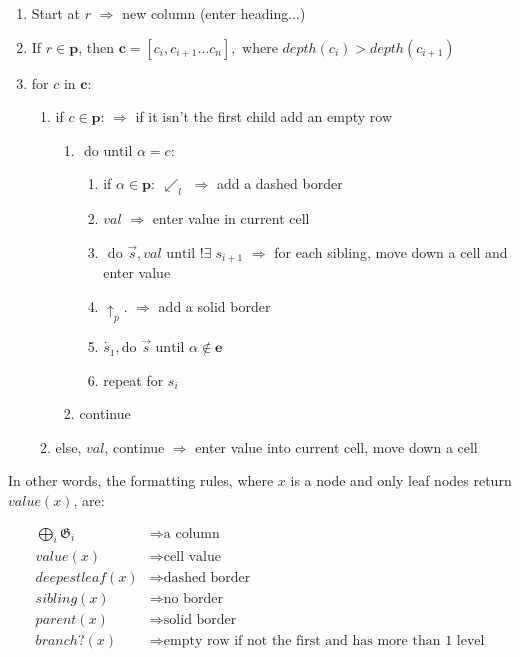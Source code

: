 \documentclass[11pt]{article}
\newcommand{\gr}[1]{\mathfrak{#1}}
\newcommand{\greycol}{black!20}
\newcommand{\grey}[1]{\textcolor{\greycol}{#1}}
\newcommand{\green}[1]{\textcolor{black!50!green}{#1}}
\begin{document}
\begin{enumerate}
	\item Start at $r$ \green{$\Rightarrow $ new column (enter heading...)}
	\item \grey{If $r \in \mathbf{p}$, then $\mathbf{c} = [c_i, c_{i+1} \dotsc c_n], \text{ where } depth(c_i) > depth(c_{i+1})$}
	\item \grey{for $c$ in $\mathbf{c}:$}
	\begin{enumerate}
			\item if $c \in \mathbf{p}$: \green{$\Rightarrow$ if it isn't the first child add an empty row}
			\begin{enumerate}
				\item \grey{$\text{ do until } \alpha = c:$}
				\begin{enumerate}
					\item if $\alpha \in \mathbf{p}: \:\swarrow_l$  \green{$\Rightarrow$ add a dashed border}
					\item $val$  \green{$\Rightarrow$ enter value in current cell}
					\item  $\text{ do } \overrightarrow{s},val \text{ until } !\exists\; s_{i+1}$ \green{$\Rightarrow$ for each sibling, move down a cell and enter value}
					\item $\uparrow_p$. \green{$\Rightarrow$ add a solid border}
					\item \grey{$\overleftarrow{s_1}, \text{do } \overrightarrow{s} \text{ until } \alpha \not\in \mathbf{e}$}
					\item \grey{repeat for $s_i$}
				\end{enumerate}
				\item \grey{continue}
			\end{enumerate}
			\item else, $val$, continue \green{$\Rightarrow$ enter value into current cell, move down a cell}
	\end{enumerate}
\end{enumerate}


In other words, the formatting rules, where $x$ is a node and only leaf nodes return $value(x)$, are:


\begin{align}
\bigoplus_i \gr{G}_i &\Rightarrow \text{a column} \\
value(x) &\Rightarrow \text{cell value}\\ 
deepestleaf(x) &\Rightarrow \text{dashed border}\\
sibling(x) &\Rightarrow \text{no border} \\
parent(x) &\Rightarrow \text{solid border}\\
branch?(x) &\Rightarrow \text{empty row if not the first and has more than 1 level}
\end{align} \label{eq:rule2}
\end{document}
